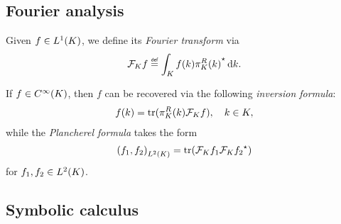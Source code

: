 \subsection{Fourier analysis}

Given $f \in \Lebesgue 1 \CompactGroup$,
we define its \emph{Fourier transform} via
\begin{align*}
    \Fourier [\CompactGroup] f \defeq \int_\CompactGroup f(k) \adj{\RightRegularRepresentation(k)} \dd k.
\end{align*}

If $f \in \SmoothFunctions \CompactGroup$,
then $f$ can be recovered via the following \emph{inversion formula}:
\begin{align*}
    f(k) = \tr(\RightRegularRepresentation(k) \Fourier [\CompactGroup] f),
    \quad k \in \CompactGroup,
\end{align*}
while the \emph{Plancherel formula} takes the form
\begin{align*}
    \ip [\Lebesgue 2 \CompactGroup] {f_1} {f_2}
    = \tr(\Fourier [\CompactGroup] f_1 \adj{\Fourier [\CompactGroup] f_2})
\end{align*}
for $f_1, f_2 \in \Lebesgue 2 \CompactGroup$.

\subsection{Symbolic calculus}

